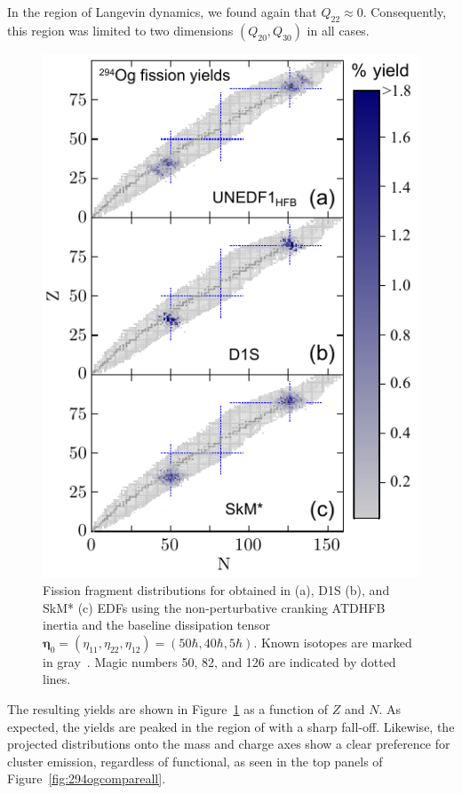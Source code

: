 In the region of Langevin dynamics, we found again that $Q_{22} \approx 0$. Consequently, this region was limited to two dimensions $(Q_{20}, Q_{30})$ in all cases.

\begin{figure}
	\centering
	\includegraphics[width=0.9\linewidth]{TeX_files/294Og_3yields}
	\caption[N-Z fission fragment yields from $^{294}$Og]{Fission fragment distributions for \Og{} obtained in \hfb{} (a), D1S (b), and SkM* (c) EDFs using the non-perturbative cranking ATDHFB inertia and  the baseline  dissipation tensor $\mathbf{\eta}_0 = (\eta_{11},\eta_{22},\eta_{12}) = (50\hbar,40\hbar,5\hbar)$. Known isotopes are marked in gray~\cite{NuDat}. Magic numbers 50, 82, and 126 are indicated by dotted lines.}
	\label{fig:294og3yields}
\end{figure}

The resulting yields are shown in Figure~\ref{fig:294og3yields} as a function of $Z$ and $N$. As expected, the yields are peaked in the region of {\Pb} with a sharp fall-off. Likewise, the projected distributions onto the mass and charge axes show a clear preference for cluster emission, regardless of functional, as seen in the top panels of Figure~\ref{fig:294ogcompareall}.

